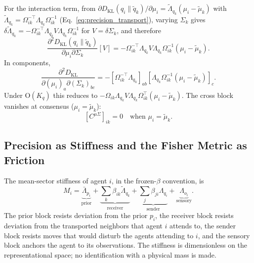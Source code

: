 \documentclass[11pt]{article}
\begin{document}
For the interaction term, from $\partial D_{\mathrm{KL}}(q_i \| \tilde{q}_k)/\partial \mu_i = \tilde{\Lambda}_{q_k}(\mu_i - \tilde{\mu}_k)$ with $\tilde{\Lambda}_{q_k} = \Omega_{ik}^{-\top}\Lambda_{q_k}\Omega_{ik}^{-1}$ (Eq.~\eqref{eq:precision_transport}), varying $\Sigma_k$ gives $\delta\tilde{\Lambda}_{q_k} = -\Omega_{ik}^{-\top}\Lambda_{q_k} V \Lambda_{q_k}\Omega_{ik}^{-1}$ for $V = \delta\Sigma_k$, and therefore
\begin{equation}
\frac{\partial^2 D_{\mathrm{KL}}(q_i \| \tilde{q}_k)}{\partial \mu_i \partial \Sigma_k}[V] = -\Omega_{ik}^{-\top}\Lambda_{q_k} V \Lambda_{q_k} \Omega_{ik}^{-1} (\mu_i - \tilde{\mu}_k).
\end{equation}
In components,
\begin{equation}
\frac{\partial^2 D_{\mathrm{KL}}}{\partial(\mu_i)_a \partial(\Sigma_k)_{bc}} = -[\Omega_{ik}^{-\top}\Lambda_{q_k}]_{ab}[\Lambda_{q_k}\Omega_{ik}^{-1}(\mu_i - \tilde{\mu}_k)]_c.
\end{equation}
Under $\mathrm{O}(K_q)$ this reduces to $-\Omega_{ik}\Lambda_{q_k} V \Lambda_{q_k}\Omega_{ik}^\top(\mu_i - \tilde{\mu}_k)$. The cross block vanishes at consensus ($\mu_i = \tilde{\mu}_k$):
\begin{equation}
\boxed{[C^{\mu\Sigma}]_{ik} = 0 \quad \text{when } \mu_i = \tilde{\mu}_k.}
\label{eq:cross_block}
\end{equation}

\subsection{Precision as Stiffness and the Fisher Metric as Friction}
\label{sec:stiffness_friction}

The mean-sector stiffness of agent $i$, in the frozen-$\beta$ convention, is
\begin{equation}
M_i = \underbrace{\bar{\Lambda}_{p_i}}_{\text{prior}} + \underbrace{\sum_k \beta_{ik}\tilde{\Lambda}_{q_k}}_{\text{receiver}} + \underbrace{\sum_j \beta_{ji}\Lambda_{q_i}}_{\text{sender}} + \underbrace{\Lambda_{o_i}}_{\text{sensory}}.
\label{eq:effective_mass}
\end{equation}
The prior block resists deviation from the prior $p_i$, the receiver block resists deviation from the transported neighbors that agent $i$ attends to, the sender block resists moves that would disturb the agents attending to $i$, and the sensory block anchors the agent to its observations. The stiffness is dimensionless on the representational space; no identification with a physical mass is made.
\end{document}
